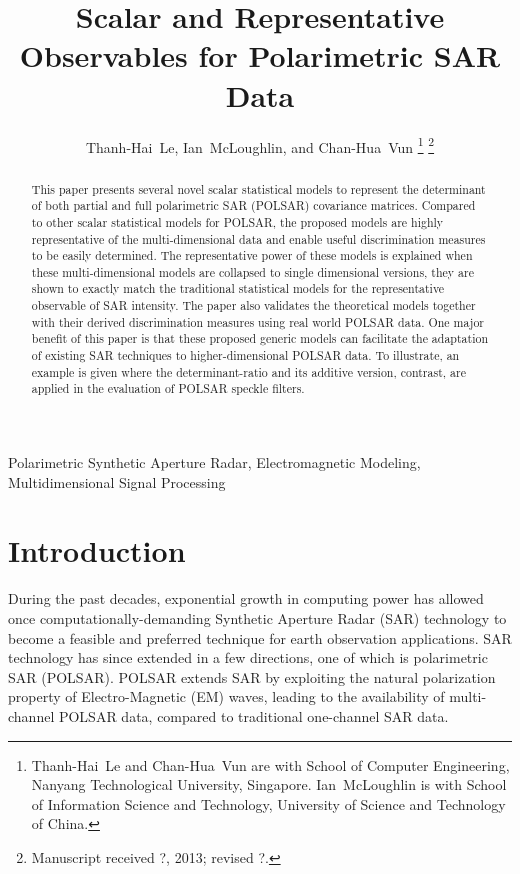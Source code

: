 \documentclass[journal]{IEEEtran}
\title{
  Scalar and Representative Observables for Polarimetric SAR Data
}
\author{Thanh-Hai~Le,
        Ian~McLoughlin, 
	and Chan-Hua~Vun%
\thanks{Thanh-Hai~Le and Chan-Hua~Vun are with School of Computer Engineering, 
Nanyang Technological University, Singapore. Ian~McLoughlin is with School of Information Science and Technology,
University of Science and Technology of China.
}%
\thanks{Manuscript received ?, 2013; revised ?.}}
\begin{document}
\maketitle

\begin{abstract}
This paper presents several novel scalar statistical models to represent the determinant of both partial and full polarimetric SAR (POLSAR) covariance matrices.
Compared to other scalar statistical models for POLSAR,
  the proposed models are highly representative of the multi-dimensional data
  and enable useful discrimination measures to be easily determined. %
The representative power of these models is explained  
when these multi-dimensional models are collapsed to single dimensional versions,
  they are shown to exactly match the traditional statistical models for the representative observable of SAR intensity.
The paper also validates the theoretical models together with their derived discrimination measures using real world POLSAR data.  
One major benefit of this paper is that these proposed generic models can facilitate the adaptation of existing SAR techniques to higher-dimensional POLSAR data.
To illustrate, an example is given where the determinant-ratio and its additive version, contrast, are applied in the evaluation of POLSAR speckle filters.
\end{abstract}

\begin{IEEEkeywords}
Polarimetric Synthetic Aperture Radar, Electromagnetic Modeling, Multidimensional Signal Processing  
\end{IEEEkeywords}

\IEEEpeerreviewmaketitle

\section{Introduction}

During the past decades, exponential growth in computing power has allowed once computationally-demanding Synthetic Aperture Radar (SAR)
technology to become a feasible and preferred technique for earth observation applications.
SAR technology has since extended in a few directions, one of which is polarimetric SAR (POLSAR).
POLSAR extends SAR by exploiting the natural polarization property of Electro-Magnetic (EM) waves,
  leading to the availability of multi-channel POLSAR data, compared to traditional one-channel SAR data.
\end{document}
